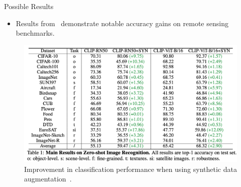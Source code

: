   
\begin{refsection}
  \begin{frame}{Possible Results}
    \begin{itemize}
      \item Results from~\parencite{heSYNTHETICDATAGENERATIVE2022} demonstrate notable accuracy gains on remote sensing benchmarks.
    \end{itemize}
    \begin{figure}
      \centering
      \includegraphics[width=0.70\linewidth]{figs/syn_aug_results.png}
      \caption{\scriptsize Improvement in classification performance when using synthetic data augmentation~\parencite{heSYNTHETICDATAGENERATIVE2022}.}
    \end{figure}
    \bottomleftrefs
  \end{frame}
  \end{refsection}

